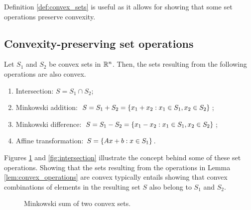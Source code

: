 Definition \ref{def:convex_sets} is useful as it allows for showing that some set operations preserve convexity. 

\subsection{Convexity-preserving set operations}

\begin{lemma} \label{lem:convex_operations}
	Let $S_1$ and $S_2$ be convex sets in $\mathbb{R}^n$. Then, the sets resulting from the following operations are also convex.
	\begin{enumerate}
		\item {Intersection:} $S = S_1 \cap S_2$;
		\item {Minkowski addition:} $S = S_1 + S_2 = \left\{ x_1 + x_2 : x_1 \in S_1, x_2 \in S_2 \right \}$;
		\item {Minkowski\hspace{-1pt} difference:}\hspace{-2pt} $S = S_1 - S_2 = \left\{ x_1 - x_2 : x_1 \in S_1, x_2 \in S_2 \right \}$;
		\item {Affine transformation:} $S = \left\{ Ax + b : x \in S_1 \right \}$.
	\end{enumerate}
\end{lemma}

Figures \ref{fig:mink_sum} and \ref{fig:intersection} illustrate the concept behind some of these set operations. Showing that the sets resulting from the operations in Lemma \ref{lem:convex_operations} are convex typically entails showing that convex combinations of elements in the resulting set $S$ also belong to $S_1$ and $S_2$.

\begin{figure}
	\centering
		\caption{Minkowski sum of two convex sets.}\label{fig:mink_sum}
\end{figure}

